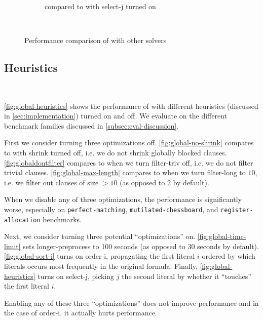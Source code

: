 \begin{figure}[!ht]
\begin{subfigure}[t]{0.3\textwidth}
        \caption{\tool compared to \tool with \textsf{select-j} turned on}
        \label{fig:global-touched}
    \end{subfigure}
    \caption{Performance comparison of \tool with other
    solvers}~\label{fig:global-heuristics}
\end{figure}



\subsection{Heuristics}~\label{app:heuristics}




\autoref{fig:global-heuristics} shows the performance of \tool with different
heuristics (discussed in \autoref{sec:implementation}) turned on and off. We
evaluate on the different benchmark families discussed in
\autoref{subsec:eval-discussion}.

First we consider turning three optimizations off.
\autoref{fig:global-no-shrink} compares \cadical to \cadical with
\textsf{shrink} turned off, i.e. we do not shrink globally blocked clauses.
\autoref{fig:globaldontfilter} compares \cadical to when we turn
\textsf{filter-triv} off, i.e. we do not filter trivial clauses.
\autoref{fig:global-max-length} compares \cadical to when we turn
\textsf{filter-long} to $10$, i.e. we filter out clauses of size $> 10$ (as opposed to $2$ by default).

When we disable any of three optimizations, the performance is significantly
worse, especially on \texttt{perfect-matching}, \texttt{mutilated-chessboard},
and \texttt{register-allocation} benchmarks.

Next, we consider turning three potential ``optimizations'' on.
\autoref{fig:global-time-limit} sets \textsf{longer-preprocess} to 100 seconds (as opposed to 30 seconds by default).
\autoref{fig:global-sort-i} turns on \textsf{order-i}, propagating the first literal $i$ 
ordered by which literals occurs most frequently in the original formula.
Finally, \autoref{fig:global-heuristics} turns on \textsf{select-j}, picking $j$
the second literal by whether it ``touches'' the first literal $i$.

Enabling any of these three ``optimizations'' does not improve performance and in the 
case of \textsf{order-i}, it actually hurts performance.